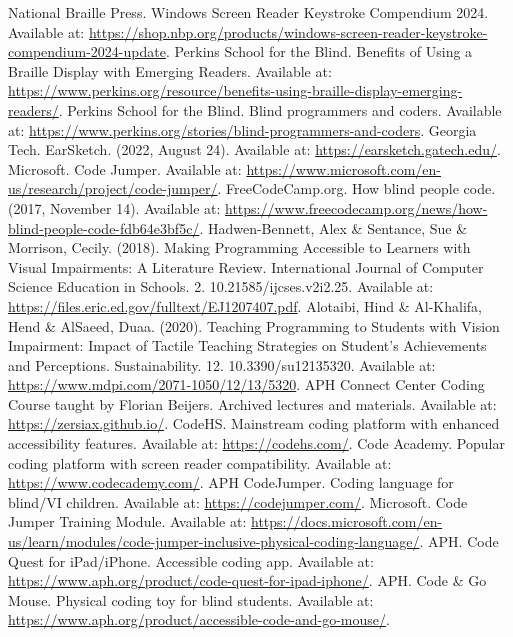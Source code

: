 \begin{thebibliography}{99}
 National Braille Press. Windows Screen Reader Keystroke Compendium 2024. Available at: \url{https://shop.nbp.org/products/windows-screen-reader-keystroke-compendium-2024-update}.
 Perkins School for the Blind. Benefits of Using a Braille Display with Emerging Readers. Available at: \url{https://www.perkins.org/resource/benefits-using-braille-display-emerging-readers/}.
 Perkins School for the Blind. Blind programmers and coders. Available at: \url{https://www.perkins.org/stories/blind-programmers-and-coders}.
 Georgia Tech. EarSketch. (2022, August 24). Available at: \url{https://earsketch.gatech.edu/}.
 Microsoft. Code Jumper. Available at: \url{https://www.microsoft.com/en-us/research/project/code-jumper/}.
 FreeCodeCamp.org. How blind people code. (2017, November 14). Available at: \url{https://www.freecodecamp.org/news/how-blind-people-code-fdb64e3bf5c/}.
 Hadwen-Bennett, Alex \& Sentance, Sue \& Morrison, Cecily. (2018). Making Programming Accessible to Learners with Visual Impairments: A Literature Review. International Journal of Computer Science Education in Schools. 2. 10.21585/ijcses.v2i2.25. Available at: \url{https://files.eric.ed.gov/fulltext/EJ1207407.pdf}.
 Alotaibi, Hind \& Al-Khalifa, Hend \& AlSaeed, Duaa. (2020). Teaching Programming to Students with Vision Impairment: Impact of Tactile Teaching Strategies on Student's Achievements and Perceptions. Sustainability. 12. 10.3390/su12135320. Available at: \url{https://www.mdpi.com/2071-1050/12/13/5320}.
 APH Connect Center Coding Course taught by Florian Beijers. Archived lectures and materials. Available at: \url{https://zersiax.github.io/}.
 CodeHS. Mainstream coding platform with enhanced accessibility features. Available at: \url{https://codehs.com/}.
 Code Academy. Popular coding platform with screen reader compatibility. Available at: \url{https://www.codecademy.com/}.
 APH CodeJumper. Coding language for blind/VI children. Available at: \url{https://codejumper.com/}.
 Microsoft. Code Jumper Training Module. Available at: \url{https://docs.microsoft.com/en-us/learn/modules/code-jumper-inclusive-physical-coding-language/}.
 APH. Code Quest for iPad/iPhone. Accessible coding app. Available at: \url{https://www.aph.org/product/code-quest-for-ipad-iphone/}.
 APH. Code \& Go Mouse. Physical coding toy for blind students. Available at: \url{https://www.aph.org/product/accessible-code-and-go-mouse/}.

\end{thebibliography}
